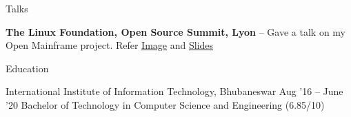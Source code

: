 \documentclass{resume} %
\begin{document}

\begin{rSection}{Talks}
  \begin{rProjectSection}
    \item \textbf {The Linux Foundation, Open Source Summit, Lyon} -- Gave a talk on my Open Mainframe project. Refer \href{https://user-images.githubusercontent.com/24803604/68012174-99a5a680-fc89-11e9-8c8e-800e68b8c231.jpeg}{Image} and \href{https://drive.google.com/file/d/1z2dhNwudUs8BYJRzIXL70UH7htLJasf0/view}{Slides}
  \end{rProjectSection}
\end{rSection}


\begin{rSection}{Education}
  \begin{rEducationSection}{International Institute of Information Technology, Bhubaneswar}
                           {Aug '16 -- June '20}
                           {Bachelor of Technology in Computer Science and Engineering (6.85/10)}
  \end{rEducationSection}
\end{rSection}
\end{document}
